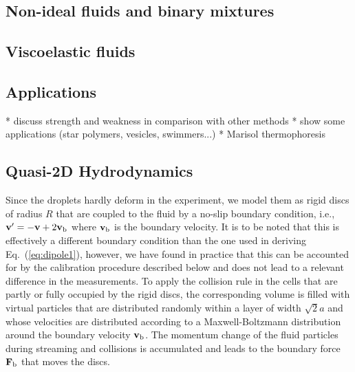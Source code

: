 \documentclass[8.5pt,twoside,twocolumn]{article}
\renewcommand{\vec}[1]{{\ensuremath{\mathchoice
                     {\mbox{\boldmath$\displaystyle\mathbf{#1}$}}
                     {\mbox{\boldmath$\textstyle\mathbf{#1}$}}
                     {\mbox{\boldmath$\scriptstyle\mathbf{#1}$}}
                     {\mbox{\boldmath$\scriptscriptstyle\mathbf{#1}$}}}}}%
\newcommand{\vvec}{\ensuremath{\vec{v}}}
\begin{document}
\subsection{Non-ideal fluids and binary mixtures}
\subsection{Viscoelastic fluids}
\subsection{Applications}

* discuss strength and weakness in comparison with other methods
* show some applications (star polymers, vesicles, swimmers...)
* Marisol thermophoresis

\subsection{Quasi-2D Hydrodynamics}

Since the droplets hardly deform in the experiment, we model them as
rigid discs of radius $R$ that are coupled to the fluid by a no-slip
boundary condition, i.e., $\vvec' = -\vvec + 2\vvec_\text{b}$ where
$\vvec_\text{b}$ is the boundary velocity. It is to be noted that this
is effectively a different boundary condition than the one used in
deriving Eq.~(\ref{eq:dipole1}), however, we have found in practice
that this can be accounted for by the calibration procedure described
below and does not lead to a relevant difference in the
measurements. To apply the collision rule in the cells that are partly
or fully occupied by the rigid discs, the corresponding volume is
filled with virtual particles that are distributed randomly within a
layer of width $\sqrt{2}a$ and whose velocities are distributed
according to a Maxwell-Boltzmann distribution around the boundary
velocity $\vvec_\text{b}$.\cite{Goetze2007} The momentum change of the
fluid particles during streaming and collisions is accumulated and
leads to the boundary force $\vec{F}_\text{b}$ that moves the
discs.\cite{Goetze2011}
\end{document}
